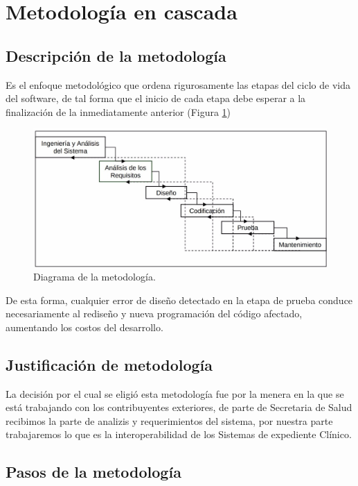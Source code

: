 \section{Metodología en cascada}
    \subsection{Descripción de la metodología}
      Es el enfoque metodológico que ordena rigurosamente las etapas del ciclo de vida
      del software, de tal forma que el inicio de cada etapa debe esperar a la finalización
      de la inmediatamente anterior (Figura \ref{metodologia})

      \begin{figure}[h]
        \centering
        \includegraphics[scale=.3]{lib/assets/diagramaMetodologia}
        \caption{Diagrama de la metodología.}
        \label{metodologia}
      \end{figure}


De esta forma, cualquier error de diseño detectado en la etapa de prueba conduce
necesariamente al rediseño y nueva programación del código afectado, aumentando
los costos del desarrollo.


  \subsection{Justificación de metodología}

  La decisión por el cual se eligió esta metodología fue por la menera en la que se está trabajando con los contribuyentes exteriores, de parte de Secretaria de Salud recibimos la parte de analizis y requerimientos del sistema, por nuestra parte trabajaremos lo que es la interoperabilidad de los Sistemas de expediente Clínico.
        \subsection{Pasos de la metodología}
